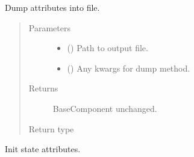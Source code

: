 \documentclass[letterpaper,10pt,english]{sphinxmanual}
\begin{document}
\begin{fulllineitems}
\begin{fulllineitems}
\label{\detokenize{api/base_classes:geology.src.base_component.BaseComponent.dump}}
Dump attributes into file.
\begin{quote}\begin{description}
\item[{Parameters}] \leavevmode\begin{itemize}
\item {} 
 () \textendash{} Path to output file.

\item {} 
 (\sphinxstyleliteralemphasis{\sphinxupquote{, }}) \textendash{} Any kwargs for dump method.

\end{itemize}

\item[{Returns}] \leavevmode
{} \textendash{} BaseComponent unchanged.

\item[{Return type}] \leavevmode
{\hyperref[\detokenize{api/base_classes:geology.src.base_component.BaseComponent}]{}}

\end{description}\end{quote}

\end{fulllineitems}


\begin{fulllineitems}
\label{\detokenize{api/base_classes:geology.src.base_component.BaseComponent.init_state}}
Init state attributes.

\end{fulllineitems}



\end{fulllineitems}
\end{document}
